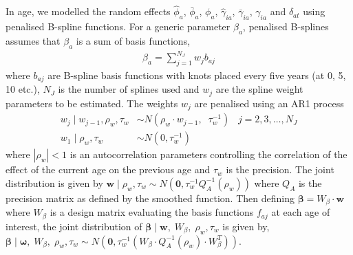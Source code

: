 \documentclass{article}
\begin{document}
\begin{appendix}
\noindent In age, we modelled the random effects $\hat{\phi}_a$, $\bar{\phi}_a$, $\phi_a$, $\hat{\gamma}_{ia}$, $\bar{\gamma}_{ia}$, $\gamma_{ia}$ and $\delta_{at}$ using penalised B-spline functions. For a generic parameter $\beta_a$, penalised B-splines assumes that $\beta_a$ is a sum of basis functions, 
\begin{align*} 
	\beta_a = \sum_{j = 1}^{N_J} w_{j}b_{aj}
\end{align*} 
where $b_{aj}$ are B-spline basis functions with knots placed every five years (at 0, 5, 10 etc.), $N_J$ is the number of splines used and $w_{j}$ are the spline weight parameters to be estimated. The weights $w_{j}$ are penalised using an AR1 process 
\begin{align*} 
  w_{j} \; | \; w_{j-1}, \rho_{w}, \tau_{w} &\sim N(\rho_{w} \cdot w_{j-1}, \;\; \tau^{-1}_{w}) \;\;\;  j = 2, 3,\ldots, N_J \\
  w_{1} \; | \; \rho_{w}, \tau_{w} &\sim N(0, \tau^{-1}_{w}) 
\end{align*}
where $|\rho_{w}| < 1$ is an autocorrelation parameters controlling the correlation of the effect of the current age on the previous age and $\tau_{w}$ is the precision. The joint distribution is given by $\boldsymbol{w}\; | \; \rho_{w}, \tau_{w} \sim N(\boldsymbol{0}, \tau_{w}^{-1}Q^{-1}_{A}(\rho_{w}))$ where $Q_{A}$ is the precision matrix as defined by the smoothed function. Then defining $\boldsymbol{\beta} = W_{\beta}\cdot \boldsymbol{w}$ where $W_{\beta}$ is a design matrix evaluating the basis functions $f_{aj}$ at each age of interest, the joint distribution of $\boldsymbol{\beta}\; | \;\boldsymbol{w}, \; W_{\beta}, \; \rho_{w}, \tau_{w}$ is given by, $\boldsymbol{\beta}\; | \;\boldsymbol{\omega}, \; W_{\beta}, \; \rho_{w}, \tau_{w} \sim N(\boldsymbol{0}, \tau_{w}^{-1}(W_{\beta}\cdot Q^{-1}_{A}(\rho_{w})\cdot W_{\beta}^T))$.\\


\end{appendix}
\end{document}
